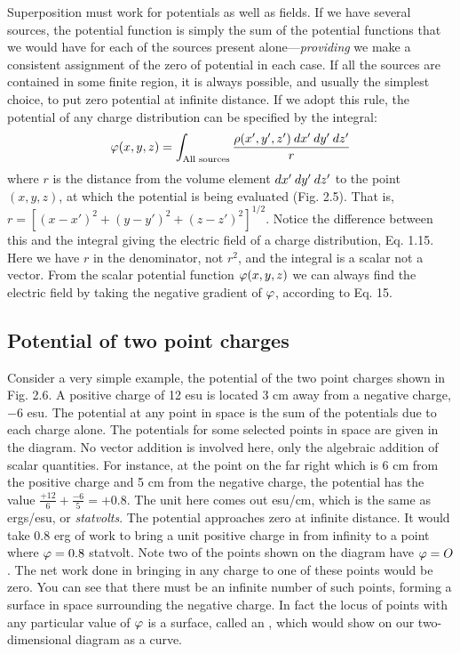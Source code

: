 Superposition must work for potentials as well as fields. If we
have several sources, the potential function is simply the sum of the
potential functions that we would have for each of the sources present
alone---\emph{providing} we make a consistent assignment of the zero of
potential in each case. If all the sources are contained in some finite
region, it is always possible, and usually the simplest choice, to put
zero potential at infinite distance. If we adopt this rule, the potential
of any charge distribution can be specified by the integral:
\begin{equation}
  \varphi(x,y,z) = \int_{\text{All sources}} \frac{\rho(x',y',z')\:d x'\:d y'\:d z'}{r}
\end{equation}
where $r$ is the distance from the volume element $d x'\:d y'\:d z'$ to the
point $(x,y,z)$, at which the potential is being evaluated (Fig. 2.5).
That is, $r = [(x - x')^2 + (y - y')^2 + (z - z')^2]^{1/2}$. Notice the
difference between this and the integral giving the electric field of a
charge distribution, Eq. 1.15. Here we have $r$ in the denominator,
not $r^2$, and the integral is a scalar not a vector. From the scalar potential
function $\varphi(x,y,z)$ we can always find the electric field by taking
the negative gradient of $\varphi$, according to Eq. 15.

\subsection{Potential of two point charges}

 Consider a very simple example,
the potential of the two point charges shown in Fig. 2.6. A positive
charge of 12 esu is located 3 cm away from a negative charge, $- 6$ esu.
The potential at any point in space is the sum of the potentials due to
each charge alone. The potentials for some selected points in space
are given in the diagram. No vector addition is involved here, only
the algebraic addition of scalar quantities. For instance, at the point
on the far right which is 6 cm from the positive charge and 5 cm from
the negative charge, the potential has the value $\frac{+12}{6}+\frac{-6}{5}=+0.8$.
The unit here comes out esu/cm, which is the same as ergs/esu, or
\emph{statvolts}. The potential approaches zero at infinite distance. It
would take 0.8 erg of work to bring a unit positive charge in from
infinity to a point where $\varphi = 0.8$ statvolt. Note two of the points
shown on the diagram have $\varphi = O$. The net work done in bringing
in any charge to one of these points would be zero. You can see that
there must be an infinite number of such points, forming a surface in
space surrounding the negative charge. In fact the locus of points
with any particular value of $\varphi$ is a surface, called an , which would show on our two-dimensional diagram as a
curve.

